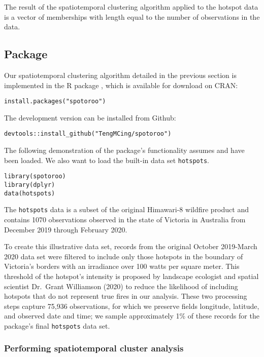 The result of the spatiotemporal clustering algorithm applied to the hotspot data is a vector of memberships with length equal to the number of observations in the data.

\hypertarget{package}{%
\subsection{Package}\label{package}}

Our spatiotemporal clustering algorithm detailed in the previous section is implemented in the R package , which is available for download on CRAN:

\begin{verbatim}
install.packages("spotoroo")
\end{verbatim}

The development version can be installed from Github:

\begin{verbatim}
devtools::install_github("TengMCing/spotoroo")
\end{verbatim}

The following demonstration of the package's functionality assumes  and  have been loaded. We also want to load the built-in data set \texttt{hotspots}.

\begin{verbatim}
library(spotoroo)
library(dplyr)
data(hotspots)
\end{verbatim}

The \texttt{hotspots} data is a subset of the original Himawari-8 wildfire product and contains 1070 observations observed in the state of Victoria in Australia from December 2019 through February 2020.

To create this illustrative data set, records from the original October 2019-March 2020 data set were filtered to include only those hotspots in the boundary of Victoria's borders with an irradiance over 100 watts per square meter. This threshold of the hotspot's intensity is proposed by landscape ecologist and spatial scientist Dr.~Grant Williamson (2020) to reduce the likelihood of including hotspots that do not represent true fires in our analysis. These two processing steps capture 75,936 observations, for which we preserve fields longitude, latitude, and observed date and time; we sample approximately 1\% of these records for the package's final \texttt{hotspots} data set.

\hypertarget{performing-spatiotemporal-cluster-analysis}{%
\subsubsection{Performing spatiotemporal cluster analysis}\label{performing-spatiotemporal-cluster-analysis}}

